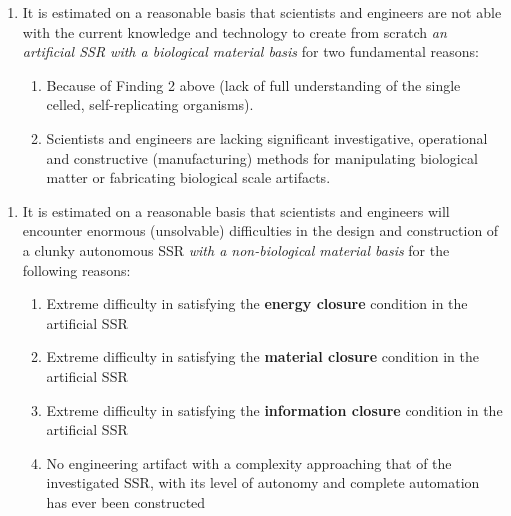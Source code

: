 \documentclass[letterpaper]{article}
\begin{document}
\bigskip

\begin{enumerate}
\item It is estimated on a reasonable basis that scientists and
engineers are not able with the current knowledge and technology to
create from scratch \textit{an artificial SSR with a biological
material basis} for two fundamental reasons:

\begin{enumerate}
\item Because of Finding 2 above (lack of full understanding of the
single celled, self-replicating organisms).
\item Scientists and engineers are lacking significant investigative,
operational and constructive (manufacturing) methods for manipulating
biological matter or fabricating biological scale artifacts.
\end{enumerate}
\end{enumerate}

\bigskip

\begin{enumerate}
\item It is estimated on a reasonable basis that scientists and
engineers will encounter enormous (unsolvable) difficulties in the
design and construction of a clunky autonomous SSR \textit{with a
non-biological material basis} for the following reasons:

\begin{enumerate}
\item Extreme difficulty in satisfying the \textbf{energy closure}
condition in the artificial SSR 
\item Extreme difficulty in satisfying the \textbf{material closure}
condition in the artificial SSR 
\item Extreme difficulty in satisfying the \textbf{information closure}
condition in the artificial SSR
\item No engineering artifact with a complexity approaching that of the
investigated SSR, with its level of autonomy and complete automation
has ever been constructed
\end{enumerate}
\end{enumerate}

\bigskip
\end{document}

